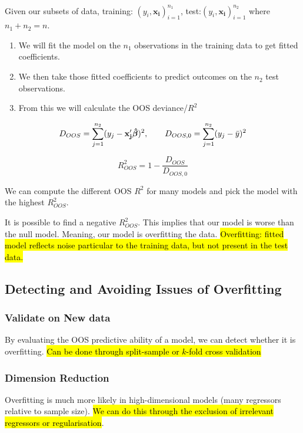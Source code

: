 \documentclass[11pt]{article}
\begin{document}
\begin{procedure}
    Given our subsets of data, training: $(y_i, \mathbf{x_i})_{i=1}^{n_1}$, test:$(y_i, \mathbf{x_i})_{i=1}^{n_2}$ where $n_1 + n_2 = n$. 
    
    \begin{enumerate}
        \item We will fit the model on the $n_1$ observations in the training data to get fitted coefficients. 
        \item We then take those fitted coefficients to predict outcomes on the $n_2$ test observations.
        \item From this we will calculate the OOS deviance/$R^2$
    \end{enumerate}
    \begin{equation*}
        D_{OOS} = \sum_{j=1}^{n_2}(y_j - \mathbf{x^\prime_j}\bm{\hat{\beta}})^2, \qquad D_{OOS,0} = \sum_{j=1}^{n_2}(y_j - \Bar{y})^2
    \end{equation*}

    \begin{equation*}
        R^2_{OOS} = 1 - \dfrac{D_{OOS}}{D_{OOS,0}}
    \end{equation*}
\end{procedure}

We can compute the different OOS $R^2$ for many models and pick the model with the highest $R^2_{OOS}$.
\begin{note}
    It is possible to find a negative $R^2_{OOS}$. This implies that our model is worse than the null model. Meaning, our model is overfitting the data. \hl{Overfitting: fitted model reflects noise particular to the training data, but not present in the test data.}
\end{note}

\subsection{Detecting and Avoiding Issues of Overfitting}

\begin{procedure}
    \hspace{1in}
    \subsubsection*{Validate on New data}
    By evaluating the OOS predictive ability of a model, we can detect whether it is overfitting. \hl{Can be done through split-sample or $k$-fold cross validation}
    \subsubsection*{Dimension Reduction}
    Overfitting is much more likely in high-dimensional models (many regressors relative to sample size). \hl{We can do this through the exclusion of irrelevant regressors or regularisation}.
\end{procedure}
\end{document}
